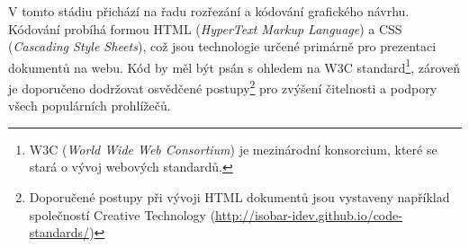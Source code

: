 V tomto stádiu přichází na řadu rozřezání a kódování grafického návrhu. Kódování probíhá formou HTML (\textit{HyperText Markup Language}) a CSS (\textit{Cascading Style Sheets}), což jsou technologie určené primárně pro prezentaci dokumentů na webu. Kód by měl být psán s ohledem na W3C standard\footnote{W3C (\textit{World Wide Web Consortium}) je mezinárodní konsorcium, které se stará o vývoj webových standardů.}, zároveň je doporučeno dodržovat osvědčené postupy\footnote{Doporučené postupy při vývoji HTML dokumentů jsou vystaveny například společností Creative Technology (\url{http://isobar-idev.github.io/code-standards/})} pro zvýšení čitelnosti a podpory všech populárních prohlížečů.
